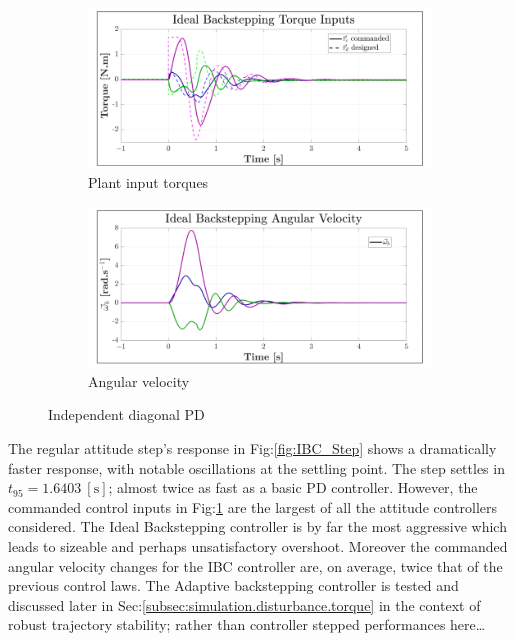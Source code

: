 \begin{figure}[htbp]\ContinuedFloat
\begin{subfigure}{0.49\textwidth}
\centering
\includegraphics[width=\textwidth]{graphs/IBC_Torque}
\caption{Plant input torques}
\label{fig:IBC_Torque}
\end{subfigure}
\begin{subfigure}{0.49\textwidth}
\centering
\includegraphics[width=\textwidth]{graphs/IBC_Angular}
\caption{Angular velocity}
\label{fig:IBC_Angular}
\end{subfigure}
\vspace{-6pt}
\caption{Independent diagonal PD}
\vspace{-12pt}
\end{figure}
\par
The regular attitude step's response in Fig:\ref{fig:IBC_Step} shows a dramatically faster response, with notable oscillations at the settling point. The step settles in $t_{95}=1.6403~[\text{s}]$; almost twice as fast as a basic PD controller. However, the commanded control inputs in Fig:\ref{fig:IBC_Torque} are the largest of all the attitude controllers considered. The Ideal Backstepping controller is by far the most aggressive which leads to sizeable and perhaps unsatisfactory overshoot. Moreover the commanded angular velocity changes for the IBC controller are, on average, twice that of the previous control laws. The Adaptive backstepping controller is tested and discussed later in Sec:\ref{subsec:simulation.disturbance.torque} in the context of robust trajectory stability; rather than controller stepped performances here\ldots 
